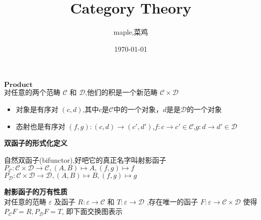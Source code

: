 \documentclass{article}
\title{Category Theory}
\author{maple,菜鸡}
\date{\today}
\begin{document}
\maketitle

\begin{flushleft}
$\textbf{Product}$ \\
对任意的两个范畴 $\mathcal{C}$ 和 $\mathcal{D}$,他们的积是一个新范畴 $\mathcal{C} \times \mathcal{D}$\\
\begin{itemize}
	\item 对象是有序对 $\left( c,d \right)$,其中$c$是$\mathcal{C}$中的一个对象，$d$是是$\mathcal{D}$的一个对象 
	\item 态射也是有序对 $\left(f,g \right) \colon \left(c,d\right) \rightarrow \left(c',d'\right)$,$f\colon c \rightarrow c' \in \mathcal{C}$,$g \colon d \rightarrow d' \in \mathcal{D}$
\end{itemize}
\end{flushleft}


\begin{flushleft}
\textbf{双函子的形式化定义} \\ 
\end{flushleft}

\begin{flushleft}
$\textbf{自然双函子}$(bifunctor),好吧它的真正名字叫$\textbf{射影函子}$ \\ 
$P_{\mathcal{C}} \colon \mathcal{C} \times \mathcal{D} \rightarrow \mathcal{C},\left( A,B \right)\mapsto A,\left( f,g \right)\mapsto f$ \\ \vbox{}
$P_{\mathcal{D}} \colon \mathcal{C} \times \mathcal{D} \rightarrow \mathcal{D},\left( A,B \right)\mapsto B,\left( f,g \right)\mapsto g$ \\
\end{flushleft}


\begin{flushleft}
\textbf{射影函子的万有性质} \\
对任意的范畴 $\varepsilon$ 及函子 $R\colon \varepsilon \rightarrow \mathcal{C}$    和 $T\colon \varepsilon \rightarrow \mathcal{D}$ ,存在唯一的函子 $F\colon \varepsilon \rightarrow \mathcal{C}\times\mathcal{D}$ 使得 $P_{\mathcal{C}}F=R,P_{\mathcal{D}}F=T$, 即下面交换图表示
\end{flushleft}
\end{document}
